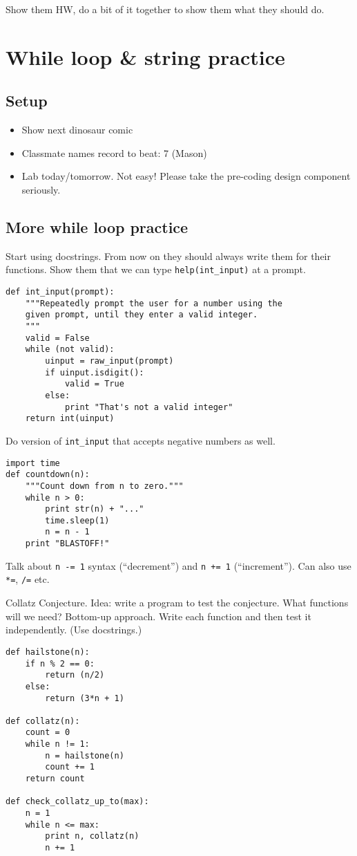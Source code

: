 \documentclass{article}
\begin{document}
Show them HW, do a bit of it together to show them what they should
do.

\newpage

\section{While loop \& string practice}

\subsection*{Setup}
\begin{itemize}
\item Show next dinosaur comic
\item Classmate names record to beat: 7 (Mason)
\item Lab today/tomorrow.  Not easy!  Please take the pre-coding
  design component seriously.
\end{itemize}

\subsection*{More while loop practice}

Start using docstrings.  From now on they should always write them for
their functions.  Show them that we can type \verb|help(int_input)| at
a prompt.
\begin{verbatim}
def int_input(prompt):
    """Repeatedly prompt the user for a number using the
    given prompt, until they enter a valid integer.
    """
    valid = False
    while (not valid):
        uinput = raw_input(prompt)
        if uinput.isdigit():
            valid = True
        else:
            print "That's not a valid integer"
    return int(uinput)
\end{verbatim}

Do version of \verb|int_input| that accepts negative numbers as well.

\begin{verbatim}
import time
def countdown(n):
    """Count down from n to zero."""
    while n > 0:
        print str(n) + "..."
        time.sleep(1)
        n = n - 1
    print "BLASTOFF!"
\end{verbatim}

Talk about \verb|n -= 1| syntax (``decrement'') and \verb|n += 1|
(``increment'').  Can also use \verb|*=|, \verb|/=| etc.

Collatz Conjecture.  Idea: write a program to test the conjecture.
What functions will we need?  Bottom-up approach.  Write each function
and then test it independently.  (Use docstrings.)
\begin{verbatim}
def hailstone(n):
    if n % 2 == 0:
        return (n/2)
    else:
        return (3*n + 1)

def collatz(n):
    count = 0
    while n != 1:
        n = hailstone(n)
        count += 1
    return count

def check_collatz_up_to(max):
    n = 1
    while n <= max:
        print n, collatz(n)
        n += 1
\end{verbatim}
\end{document}
